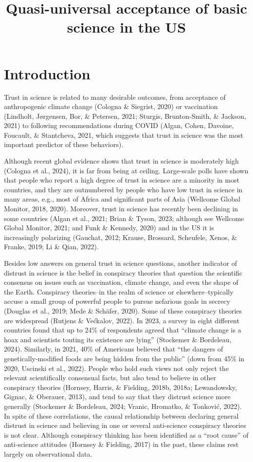 \documentclass[
  doc,floatsintext]{apa6}
\title{Quasi-universal acceptance of basic science in the US}
\author{\textsuperscript{}}
\date{}
\affiliation{\vspace{0.5cm}\textsuperscript{} }
\begin{document}
\maketitle

\section{Introduction}\label{introduction}

Trust in science is related to many desirable outcomes, from acceptance of anthropogenic climate change (Cologna \& Siegrist, 2020) or vaccination (Lindholt, Jørgensen, Bor, \& Petersen, 2021; Sturgis, Brunton-Smith, \& Jackson, 2021) to following recommendations during COVID (Algan, Cohen, Davoine, Foucault, \& Stantcheva, 2021, which suggests that trust in science was the most important predictor of these behaviors).

Although recent global evidence shows that trust in science is moderately high (Cologna et al., 2024), it is far from being at ceiling. Large-scale polls have shown that people who report a high degree of trust in science are a minority in most countries, and they are outnumbered by people who have low trust in science in many areas, e.g., most of Africa and significant parts of Asia (Wellcome Global Monitor, 2018, 2020). Moreover, trust in science has recently been declining in some countries (Algan et al., 2021; Brian \& Tyson, 2023; although see Wellcome Global Monitor, 2021; and Funk \& Kennedy, 2020) and in the US it is increasingly polarizing (Gauchat, 2012; Krause, Brossard, Scheufele, Xenos, \& Franke, 2019; Li \& Qian, 2022).

Besides low answers on general trust in science questions, another indicator of distrust in science is the belief in conspiracy theories that question the scientific consensus on issues such as vaccination, climate change, and even the shape of the Earth. Conspiracy theories--in the realm of science or elsewhere--typically accuse a small group of powerful people to pursue nefarious goals in secrecy (Douglas et al., 2019; Mede \& Schäfer, 2020). Some of these conspiracy theories are widespread (Rutjens \& Većkalov, 2022). In 2023, a survey in eight different countries found that up to 24\% of respondents agreed that ``climate change is a hoax and scientists touting its existence are lying'' (Stockemer \& Bordeleau, 2024). Similarly, in 2021, 40\% of Americans believed that ``the dangers of genetically-modified foods are being hidden from the public'' (down from 45\% in 2020, Uscinski et al., 2022). People who hold such views not only reject the relevant scientifically consensual facts, but also tend to believe in other conspiracy theories (Hornsey, Harris, \& Fielding, 2018b, 2018a; Lewandowsky, Gignac, \& Oberauer, 2013), and tend to say that they distrust science more generally (Stockemer \& Bordeleau, 2024; Vranic, Hromatko, \& Tonković, 2022). In spite of these correlations, the causal relationship between declaring general distrust in science and believing in one or several anti-science conspiracy theories is not clear. Although conspiracy thinking has been identified as a ``root cause'' of anti-science attitudes (Hornsey \& Fielding, 2017) in the past, these claims rest largely on observational data.
\end{document}
